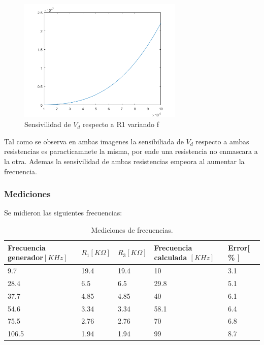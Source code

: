 \documentclass[../../main.tex]{subfiles}
\begin{document}
\begin{figure}[H]	
	\centering
	\includegraphics[width=0.7\textwidth]{fotos/r1f.png}
	\caption{Sensivilidad de $V_d$ respecto a R1 variando f}
\end{figure}


Tal como se observa en ambas imagenes la sensibiliada de $V_d$ respecto a ambas resistencias es paracticamnete la misma, por ende una resistencia no enmascara a la otra. Ademas la sensivilidad de ambas resistencias empeora al aumentar la frecuencia.




\subsubsection{Mediciones}
Se midieron las siguientes frecuencias:

\begin{table}[H]
\begin{center}
\begin{tabular}{|l|l|l|l|l|}
\hline
Frecuencia generador$[KHz]$& $R_1 [K\Omega]$ & $R_3[K\Omega]$ & Frecuencia calculada $[KHz]$ &Error[ \% ]\\
\hline \hline
9.7 & 19.4& 19.4&10&3.1  \\ \hline
28.4 & 6.5& 6.5&29.8&5.1  \\ \hline
37.7 & 4.85& 4.85&40&6.1  \\ \hline
54.6 & 3.34& 3.34&58.1&6.4  \\ \hline
75.5 & 2.76& 2.76&70&6.8  \\ \hline
106.5 & 1.94& 1.94&99&8.7  \\ \hline

\end{tabular}
\caption{Mediciones de frecuencias.} 
\end{center}
\end{table}
\end{document}
